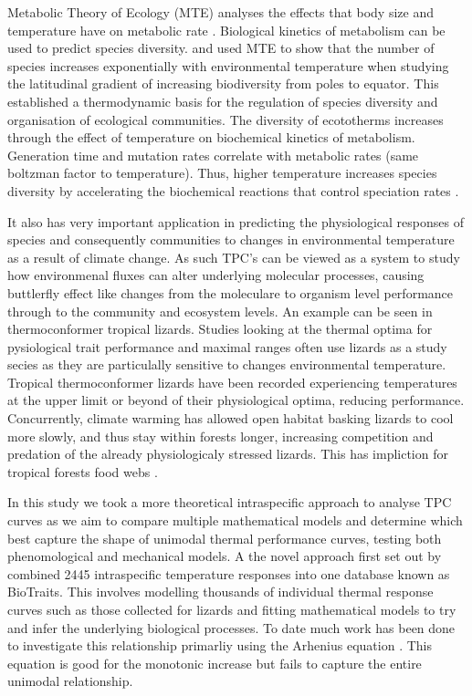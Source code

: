 \documentclass[11pt]{article}
\begin{document}
	Metabolic Theory of Ecology (MTE) analyses the effects that body size and temperature have on metabolic rate \citep{wang2009temperature}. Biological kinetics of metabolism can be used to predict species diversity. \citep{allen2002global} and \citep{wang2009temperature} used MTE to show that the number of species increases exponentially with environmental temperature when studying the latitudinal gradient of increasing biodiversity from poles to equator. This established a thermodynamic basis for the regulation of species diversity and organisation of ecological communities. The diversity of ecototherms increases through the effect of temperature on biochemical kinetics of metabolism. Generation time and mutation rates correlate with metabolic rates (same boltzman factor to temperature). Thus, higher temperature increases species diversity by accelerating the biochemical reactions that control speciation rates \citep{allen2002global}.  
	
	It also has very important application in predicting the physiological responses of species and consequently communities to changes in environmental temperature as a result of climate change. As such TPC's can be viewed as a system to study how environmenal fluxes can alter underlying molecular processes, causing buttlerfly effect like changes from the moleculare to organism level performance through to the community and ecosystem levels. An example can be seen in thermoconformer tropical lizards. Studies looking at the thermal optima for pysiological trait performance and maximal ranges often use lizards as a study secies as they are particulally sensitive to changes environmental temperature. Tropical thermoconformer lizards have been recorded experiencing temperatures at the upper limit or beyond of their physiological optima, reducing performance. Concurrently, climate warming has allowed open habitat basking lizards to cool more slowly, and thus stay within forests longer, increasing competition and predation of the already physiologicaly stressed lizards. This has impliction for tropical forests food webs \citep{huey2009tropical}.  
	 
	In this study we took a more theoretical intraspecific approach to analyse TPC curves as we aim to compare multiple mathematical models and determine which best capture the shape of unimodal thermal performance curves, testing both phenomological and mechanical models. A the novel approach first set out by \cite{dell2011systematic} combined 2445 intraspecific temperature responses into one database known as BioTraits. This involves modelling thousands of individual thermal response curves such as those collected for lizards and fitting mathematical models to try and infer the underlying biological processes.  To date much work has been done to investigate this relationship primarliy using the Arhenius equation \citep{delong2017combined}. This equation is good for the monotonic increase but fails to capture the entire unimodal relationship. 
	
\end{document}
